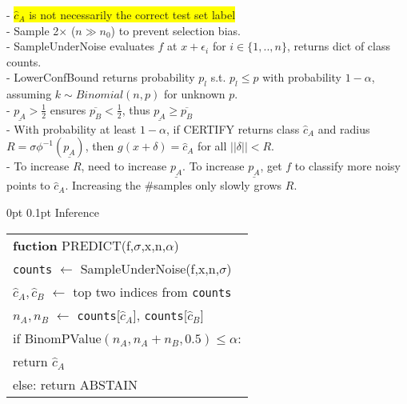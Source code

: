 \documentclass[11pt,landscape,a4paper,fleqn]{article}
\makeatletter
\renewcommand{\subsection}{\@startsection{subsection}{1}{0mm}%
                                {0pt}%
                                {0.1pt}%
                            	{\color{myorange2}\sffamily\small}}
\newcommand{\mhl}[1]{\setlength{\fboxsep}{0pt}\colorbox{yellow}{#1}}
\makeatother
\begin{document}
\begin{multicols*}{4}
- \mhl{$\hat{c}_A$ is not necessarily the correct test set label}\\
- Sample 2$\times$ ($n \gg n_0$) to prevent selection bias.\\
- SampleUnderNoise evaluates $f$ at $x + \epsilon_i$ for $i \in \{1,..,n\}$, returns dict of class counts.\\
- LowerConfBound returns probability $p_l$ s.t. $p_l \leq p$ with probability $1 - \alpha$, assuming $k \sim Binomial(n,p)$ for unknown $p$.\\
- $\underline{p_A} > \frac{1}{2}$ ensures $\overline{p_B} < \frac{1}{2}$, thus $\underline{p_A} \geq \overline{p_B}$\\
- With probability at least $1 - \alpha$, if CERTIFY returns class $\hat{c}_A$ and radius $R = \sigma \phi^{-1}(\underline{p_A})$, then $g(x+\delta) = \hat{c}_A$ for all $||\delta|| < R$.\\
- To increase $R$, need to increase $\underline{p_A}$. To increase $\underline{p_A}$, get $f$ to classify more noisy points to $\hat{c}_A$. Increasing the \#samples only slowly grows $R$.

\vspace*{1mm}
\subsection{Inference}

\begin{tabular}{l}
\hline 
\textbf{fuction} PREDICT(f,$\sigma$,x,n,$\alpha$) \hfil \\
\-\hspace*{3mm} \texttt{counts} $\leftarrow$ SampleUnderNoise(f,x,n,$\sigma$) \hfil \\
\-\hspace*{3mm} $\hat{c}_A, \hat{c}_B$ $\leftarrow$ top two indices from \texttt{counts} \hfill \\
\-\hspace*{3mm} $n_A, n_B$ $\leftarrow$ \texttt{counts}[$\hat{c}_A$], \texttt{counts}[$\hat{c}_B$] \hfil \\
\-\hspace*{3mm} if BinomPValue$(n_A,n_A + n_B,0.5) \leq \alpha$: \hfill \\
\-\hspace*{6mm} return $\hat{c}_A$ \hfill \\
\-\hspace*{3mm} else: return ABSTAIN \hfill \\ 
\hline 
\end{tabular} 


\end{multicols*}
\end{document}
